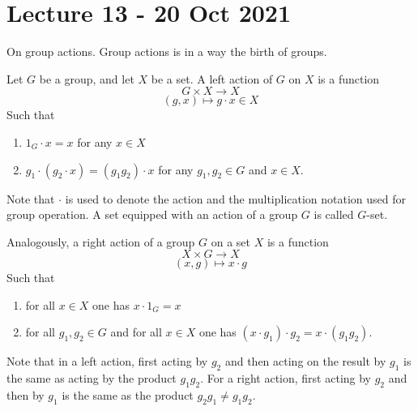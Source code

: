 \section{Lecture 13 - 20 Oct 2021}
On group actions. Group actions is in a way the birth of groups.
\begin{definition} 
  Let $G$ be a group, and let $X$ be a set. A left action of $G$ on $X$ is a function
  \[G\times X \to X\]
  \[(g,x)\mapsto g\cdot x\in X\]
  Such that 
  \begin{enumerate}
    \item $1_G \cdot x=x$ for any $x\in X$
    \item $g_1 \cdot (g_2\cdot x) = (g_1g_2)\cdot x$ for any $g_1,g_2\in G$ and $x\in X$.
  \end{enumerate}
  Note that $\cdot$ is used to denote the action and the multiplication notation used for
  group operation. A set equipped with an action of a group $G$ is called $G$-set.
  \label{def:leftAction}
\end{definition}

\begin{definition}
  Analogously, a right action of a group $G$ on a set $X$ is a function
  \[X\times G \to X\]
  \[(x,g)\mapsto x\cdot g\]
  Such that
  \begin{enumerate}
    \item for all $x\in X$ one has $x\cdot 1_G=x$
    \item for all $g_1,g_2\in G$ and for all $x\in X$ one has $(x\cdot g_1)\cdot g_2 =
      x\cdot (g_1g_2)$.
  \end{enumerate}
  \label{def:rightAction}
\end{definition}

\begin{remark}
  Note that in a left action, first acting by $g_2$ and then acting on the result by $g_1$
  is the same as acting by the product $g_1g_2$. For a right action, first acting by $g_2$
  and then by $g_1$ is the same as the product $g_2g_1\neq g_1g_2$.
\end{remark}

